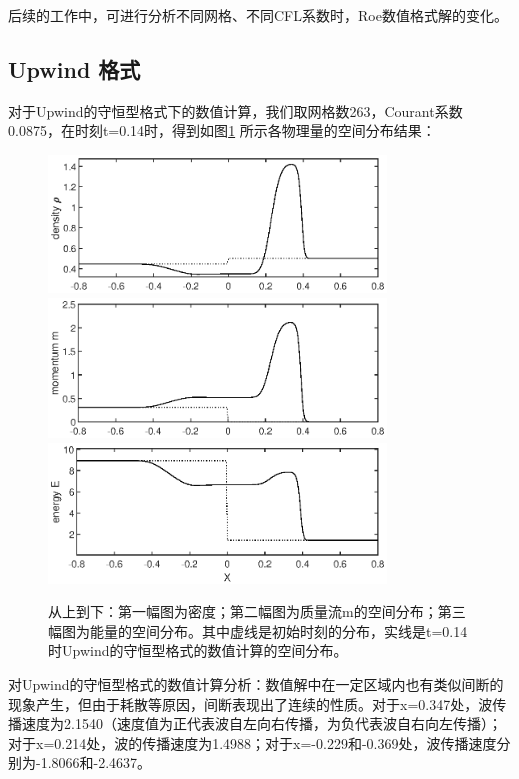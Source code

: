 \documentclass{article}
\begin{document}
后续的工作中，可进行分析不同网格、不同CFL系数时，Roe数值格式解的变化。
\par
\subsection{Upwind 格式}
对于Upwind的守恒型格式下的数值计算，我们取网格数263，Courant系数0.0875，在时刻t=0.14时，得到如图\ref{fig:upwind1} 所示各物理量的空间分布结果：
\begin{figure}[H]
\centering
\includegraphics[width=0.8\textwidth]{Upwind_con_d.eps}
\includegraphics[width=0.8\textwidth]{Upwind_con_m.eps}
\includegraphics[width=0.8\textwidth]{Upwind_con_e.eps}
\caption{从上到下：第一幅图为密度；第二幅图为质量流m的空间分布；第三幅图为能量的空间分布。其中虚线是初始时刻的分布，实线是t=0.14时Upwind的守恒型格式的数值计算的空间分布。}
\label{fig:upwind1}
\end{figure}
对Upwind的守恒型格式的数值计算分析：数值解中在一定区域内也有类似间断的现象产生，但由于耗散等原因，间断表现出了连续的性质。对于x=0.347处，波传播速度为2.1540（速度值为正代表波自左向右传播，为负代表波自右向左传播）；对于x=0.214处，波的传播速度为1.4988；对于x=-0.229和-0.369处，波传播速度分别为-1.8066和-2.4637。
\par
\end{document}
